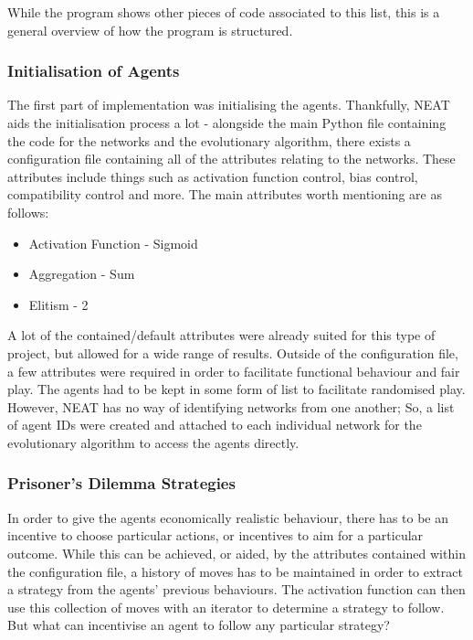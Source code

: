 \documentclass[12pt,a4paper]{article}
\begin{document}
While the program shows other pieces of code associated to this list, this is a general overview of how the program is structured. \\

\subsubsection{Initialisation of Agents}
The first part of implementation was initialising the agents. Thankfully, NEAT aids the initialisation process a lot - alongside the main Python file containing the code for the networks and the evolutionary algorithm, there exists a configuration file containing all of the attributes relating to the networks. These attributes include things such as activation function control, bias control, compatibility control and more. The main attributes worth mentioning are as follows: \\

\begin{itemize}
  \item Activation Function - Sigmoid
  \item Aggregation - Sum
  \item Elitism - 2 \\
\end{itemize}

A lot of the contained/default attributes were already suited for this type of project, but allowed for a wide range of results. Outside of the configuration file, a few attributes were required in order to facilitate functional behaviour and fair play. The agents had to be kept in some form of list to facilitate randomised play. However, NEAT has no way of identifying networks from one another; So, a list of agent IDs were created and attached to each individual network for the evolutionary algorithm to access the agents directly.

\subsubsection{Prisoner's Dilemma Strategies}
In order to give the agents economically realistic behaviour, there has to be an incentive to choose particular actions, or incentives to aim for a particular outcome. While this can be achieved, or aided, by the attributes contained within the configuration file, a history of moves has to be maintained in order to extract a strategy from the agents' previous behaviours. The activation function can then use this collection of moves with an iterator to determine a strategy to follow. But what can incentivise an agent to follow any particular strategy?
\end{document}
